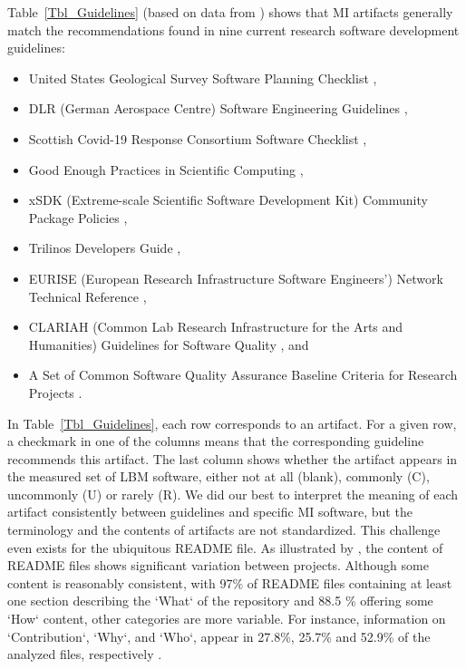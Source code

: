 \documentclass[final, 3p, times, authoryear]{elsarticle}
\begin{document}
Table~\ref{Tbl_Guidelines} (based on data from \citep{SmithAndMichalski2022})
shows that MI artifacts generally match the recommendations found in nine
current research software development guidelines:
\begin{itemize}
\item United States Geological Survey Software Planning Checklist
\citep{USGS2019},
\item DLR (German Aerospace Centre) Software Engineering Guidelines
\citep{TobiasEtAl2018}, 
\item Scottish Covid-19 Response Consortium Software Checklist
\citep{BrettEtAl2021},
\item Good Enough Practices in Scientific Computing \citep{WilsonEtAl2016},
\item xSDK (Extreme-scale Scientific Software Development Kit) Community Package
Policies \citep{SmithAndRoscoe2018},
\item Trilinos Developers Guide \citep{HerouxEtAl2008},
\item EURISE (European Research Infrastructure Software Engineers') Network
Technical Reference \citep{ThielEtAl2020},
\item CLARIAH (Common Lab Research Infrastructure for the Arts and Humanities)
Guidelines for Software Quality \citep{vanGompelEtAl2016}, and
\item A Set of Common Software Quality Assurance Baseline Criteria for Research
Projects \citep{OrvizEtAl2017}.
\end{itemize}

In Table~\ref{Tbl_Guidelines}, each row corresponds to an artifact.  For a given
row, a checkmark in one of the columns means that the corresponding guideline
recommends this artifact.  The last column shows whether the artifact appears in
the measured set of LBM software, either not at all (blank), commonly (C),
uncommonly (U) or rarely (R).  We did our best to interpret the meaning of each
artifact consistently between guidelines and specific MI software, but the
terminology and the contents of artifacts are not standardized.  This challenge
even exists for the ubiquitous README file.  As illustrated by
\citet{PranaEtAl2018}, the content of README files shows significant variation
between projects.  Although some content is reasonably consistent, with 97\% of
README files containing at least one section describing the `What` of the
repository and 88.5 \% offering some `How` content, other categories are more
variable.  For instance, information on `Contribution`, `Why`, and `Who`,
appear in 27.8\%, 25.7\% and 52.9\% of the analyzed files, respectively
\citep{PranaEtAl2018}.  
\end{document}
